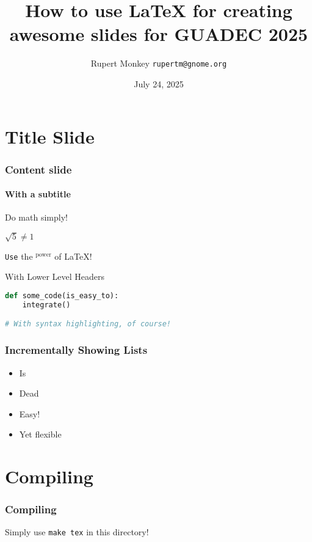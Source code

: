 \documentclass[aspectratio=169]{beamer}
\title[How to use \LaTeX{} for GUADEC 2025]{How to use \LaTeX{} for creating awesome slides for GUADEC 2025}
\author{Rupert Monkey \texttt{rupertm@gnome.org}}
\date{July 24, 2025}
\begin{document}
\begin{frame}
\titlepage
\end{frame}

\section{Title Slide}

\begin{frame}[containsverbatim]
\frametitle{Content slide}
\framesubtitle{With a subtitle}

    Do math simply!

    \begin{center}
        $\sqrt{5} \neq 1$
    \end{center}

    \texttt{Use} the $^\text{power}$ of \LaTeX!

    \begin{block}{With Lower Level Headers}
        \begin{lstlisting}[language=Python]
def some_code(is_easy_to):
    integrate()

# With syntax highlighting, of course!
        \end{lstlisting}
    \end{block}
\end{frame}

\begin{frame}
\frametitle{Incrementally Showing Lists}

    \begin{itemize}
        \item<1-> Is
        \item<2-| alert@2> Dead
        \item<3-> Easy!
        \item<1-> Yet flexible
    \end{itemize}
\end{frame}

\section{Compiling}

\begin{frame}
\frametitle{Compiling}

    Simply use \texttt{make tex} in this directory!
\end{frame}
\end{document}
